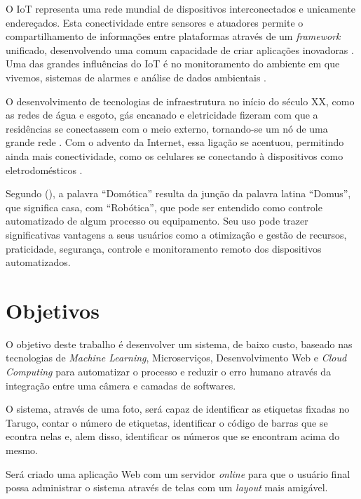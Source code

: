 O IoT representa uma rede mundial de dispositivos interconectados e unicamente endereçados. Esta conectividade entre sensores e atuadores permite o compartilhamento de informações entre plataformas através de um \textit{framework} unificado, desenvolvendo uma comum capacidade de criar aplicações inovadoras  \cite{RisteskaStojkoska2017}. Uma das grandes influências do IoT é no monitoramento do ambiente em que vivemos, sistemas de alarmes e análise de dados ambientais \cite{Perumal2016}. %

O desenvolvimento de tecnologias de infraestrutura no início do século XX, como as redes de água e esgoto, gás encanado e eletricidade fizeram com que a residências se conectassem com o meio externo, tornando-se um nó de uma grande rede \cite{forty2007objetos}. Com o advento da Internet, essa ligação se acentuou, permitindo ainda mais conectividade, como os celulares se conectando à dispositivos como eletrodomésticos \cite{VarelaDeSouza}.

Segundo \citeauthor{VarelaDeSouza} (\citeyear{VarelaDeSouza}), a palavra “Domótica” resulta da junção da palavra latina
“Domus”, que significa casa, com “Robótica”, que pode ser entendido como controle automatizado de algum processo ou equipamento. Seu uso pode trazer significativas vantagens a seus usuários como a otimização e gestão de recursos, praticidade, segurança, controle e monitoramento remoto dos dispositivos automatizados.



\section{Objetivos} 

O objetivo deste trabalho é desenvolver um sistema, de baixo custo, baseado nas tecnologias de \textit{Machine Learning}, Microserviços, Desenvolvimento Web e \textit{Cloud Computing} para automatizar o processo e reduzir o erro humano através da integração entre uma câmera e camadas de softwares. 

O sistema, através de uma foto, será capaz de identificar as etiquetas fixadas no Tarugo, contar o número de etiquetas, identificar o código de barras que se econtra nelas e, alem disso, identificar os números que se encontram acima do mesmo.

Será criado uma aplicação Web com um servidor \textit{online} para que o usuário final possa administrar o sistema através de telas com um \textit{layout} mais amigável.

